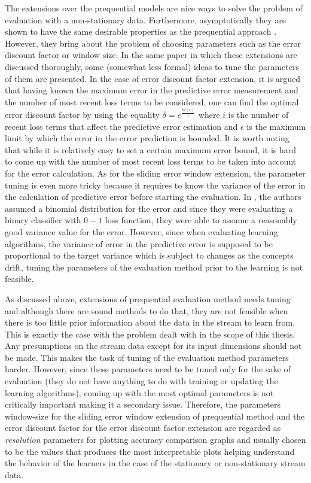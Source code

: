 The extensions over the prequential models are nice ways to solve the problem of evaluation with a non-stationary data. Furthermore, asymptotically they are shown to have the same desirable properties as the prequential approach \cite{gama_evaluating_2013}. However, they bring about the problem of choosing parameters such as the error discount factor or window size. In the same paper in which these extensions are discussed thoroughly, some (somewhat less formal) ideas to tune the parameters of them are presented. In the case of error discount factor extension, it is argued that having known the maximum error in the predictive error measurement and the number of most recent loss terms to be considered, one can find the optimal error discount factor by using the equality $\delta = e^{\frac{ln(\epsilon)}{i}}$ where $i$ is the number of recent loss terms that affect the predictive error estimation and $\epsilon$ is the maximum limit by which the error in the error prediction is bounded. It is worth noting that while it is relatively easy to set a certain maximum error bound, it is hard to come up with the number of most recent loss terms to be taken into account for the error calculation. As for the sliding error window extension, the parameter tuning is even more tricky because it requires to know the variance of the error in the calculation of predictive error before starting the evaluation. In \cite{gama_evaluating_2013}, the authors assumed a binomial distribution for the error and since they were evaluating a binary classifier with $0-1$ loss function, they were able to assume a reasonably good variance value for the error. However, since when evaluating learning algorithms, the variance of error in the predictive error is supposed to be proportional to the target variance which is subject to changes as the concepts drift, tuning the parameters of the evaluation method prior to the learning is not feasible.

As discussed above, extensions of prequential evaluation method needs tuning and although there are sound methods to do that, they are not feasible when there is too little prior information about the data in the stream to learn from. This is exactly the case with the problem dealt with in the scope of this thesis. Any presumptions on the stream data except for its input dimensions should not be made. This makes the task of tuning of the evaluation method parameters harder. However, since these parameters need to be tuned only for the sake of evaluation (they do not have anything to do with training or updating the learning algorithms), coming up with the most optimal parameters is not critically important making it a secondary issue. Therefore, the parameters window-size for the sliding error window extension of prequential method and the error discount factor for the error discount factor extension are regarded as \textit{resolution} parameters for plotting accuracy comparison graphs and usually chosen to be the values that produces the most interpretable plots helping understand the behavior of the learners in the case of the stationary or non-stationary stream data.

